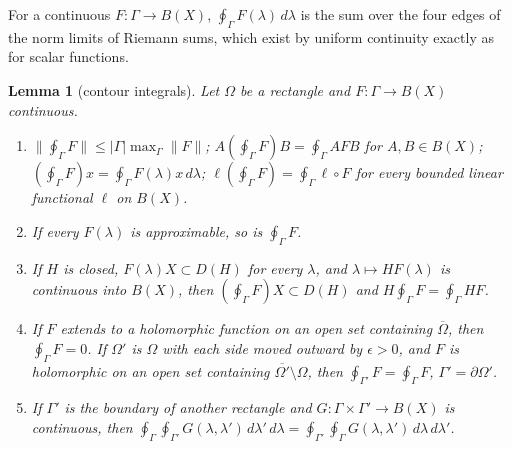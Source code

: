 \documentclass[11pt]{article}
\newtheorem{lemma}{Lemma}[section]
\theoremstyle{definition}
\begin{document}
For a continuous $F: \Gamma \to B(X)$, $\oint_\Gamma F(\lambda)\,d\lambda$ is the sum over the four edges of the norm limits of Riemann sums, which exist by uniform continuity exactly as for scalar functions.

\begin{lemma}[contour integrals]\label{lem:A-int}
Let $\Omega$ be a rectangle and $F: \Gamma \to B(X)$ continuous.
\begin{enumerate}
\item[(a)] $\|\oint_\Gamma F\| \le |\Gamma|\max_\Gamma\|F\|$; $A(\oint_\Gamma F)B = \oint_\Gamma AFB$ for $A, B \in B(X)$; $(\oint_\Gamma F)x = \oint_\Gamma F(\lambda)x\,d\lambda$; $\ell(\oint_\Gamma F) = \oint_\Gamma\ell\circ F$ for every bounded linear functional $\ell$ on $B(X)$.
\item[(b)] If every $F(\lambda)$ is approximable, so is $\oint_\Gamma F$.
\item[(c)] If $H$ is closed, $F(\lambda)X \subset D(H)$ for every $\lambda$, and $\lambda \mapsto HF(\lambda)$ is continuous into $B(X)$, then $(\oint_\Gamma F)X \subset D(H)$ and $H\oint_\Gamma F = \oint_\Gamma HF$.
\item[(d)] If $F$ extends to a holomorphic function on an open set containing $\overline\Omega$, then $\oint_\Gamma F = 0$. If $\Omega'$ is $\Omega$ with each side moved outward by $\epsilon > 0$, and $F$ is holomorphic on an open set containing $\overline{\Omega'}\setminus\Omega$, then $\oint_{\Gamma'}F = \oint_\Gamma F$, $\Gamma' = \partial\Omega'$.
\item[(e)] If $\Gamma'$ is the boundary of another rectangle and $G: \Gamma \times \Gamma' \to B(X)$ is continuous, then $\oint_\Gamma\oint_{\Gamma'}G(\lambda, \lambda')\,d\lambda'\,d\lambda = \oint_{\Gamma'}\oint_\Gamma G(\lambda, \lambda')\,d\lambda\,d\lambda'$.
\end{enumerate}
\end{lemma}
\end{document}
